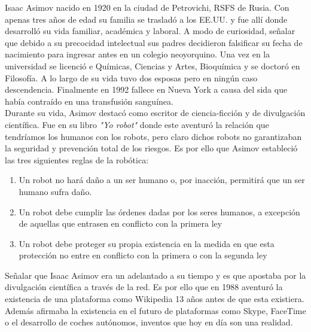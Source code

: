 Isaac Asimov nacido en 1920 en la ciudad de Petrovichi, RSFS de Rusia. Con apenas tres años de edad su familia se trasladó a los EE.UU. y fue allí donde desarrolló su vida familiar, académica y laboral. A modo de curiosidad, señalar que debido a su precocidad intelectual sus padres decidieron falsificar su fecha de nacimiento para ingresar antes en un colegio neoyorquino. Una vez en la universidad se licenció e Químicas, Ciencias y Artes, Bioquímica y se doctoró en Filosofía. A lo largo de su vida tuvo dos esposas pero en ningún caso descendencia. Finalmente en 1992 fallece en Nueva York a causa del sida que había contraído en una transfusión sanguínea.\\

Durante su vida, Asimov destacó como escritor de ciencia-ficción y de divulgación científica. Fue en su libro \textit{"Yo robot"} donde este aventuró la relación que tendríamos los humanos con los robots, pero claro dichos robots no garantizaban la seguridad y prevención total de los riesgos. Es por ello que Asimov estableció las tres siguientes reglas de la robótica:

\begin{enumerate}
\item Un robot no hará daño a un ser humano o, por inacción, permitirá que un ser humano sufra daño.
\item Un robot debe cumplir las órdenes dadas por los seres humanos, a excepción de aquellas que entrasen en conflicto con la primera ley
\item Un robot debe proteger su propia existencia en la medida en que esta protección no entre en conflicto con la primera o con la segunda ley
\end{enumerate}

Señalar que Isaac Asimov era un adelantado a su tiempo y es que apostaba por la divulgación científica a través de la red. Es por ello que en 1988 aventuró la existencia de una plataforma como Wikipedia 13 años antes de que esta existiera. Además afirmaba la existencia en el futuro de plataformas como Skype, FaceTime o el desarrollo de coches autónomos, inventos que hoy en día son una realidad.
